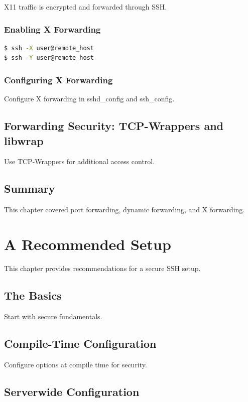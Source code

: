 \documentclass[12pt]{book}
\begin{document}
X11 traffic is encrypted and forwarded through SSH.

\subsection{Enabling X Forwarding}

\begin{lstlisting}[language=bash]
$ ssh -X user@remote_host
$ ssh -Y user@remote_host
\end{lstlisting}

\subsection{Configuring X Forwarding}

Configure X forwarding in sshd_config and ssh_config.

\section{Forwarding Security: TCP-Wrappers and libwrap}

Use TCP-Wrappers for additional access control.

\section{Summary}

This chapter covered port forwarding, dynamic forwarding, and X forwarding.

\chapter{A Recommended Setup}

This chapter provides recommendations for a secure SSH setup.

\section{The Basics}

Start with secure fundamentals.

\section{Compile-Time Configuration}

Configure options at compile time for security.

\section{Serverwide Configuration}
\end{document}
